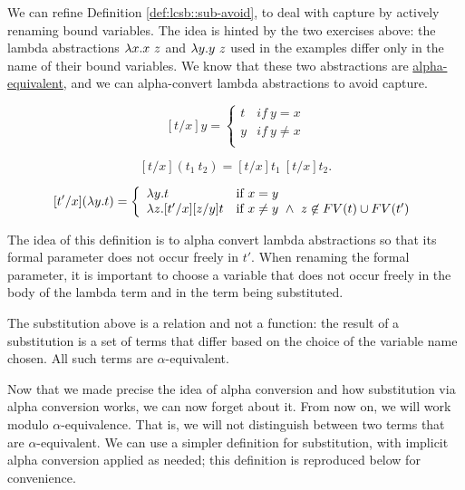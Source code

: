 We can refine
%
Definition \ref{def:lcsb::sub-avoid},
%
to deal with capture by actively renaming bound variables.
%
The idea is hinted by the two exercises above:  the lambda
abstractions $\lambda x.x~z$ and $\lambda y.y~z$ used in the examples differ only in the name of their bound variables.  
%
We know that these two abstractions are 
%
\href{def:lcs::alpha}{alpha-equivalent}, and
%
we can alpha-convert lambda abstractions to avoid capture.  

\begin{flex}
\begin{definition}
\label{def:lcsb::sub-exp}
\[
[t/x]y = \left\{ \begin{array}{ll}
        t & if~y = x \\
        y & if~y\neq x \\
        \end{array} \right.
\]


\[
[t/x](t_1~t_2) = [t/x]t_1~[t/x]t_2.
 \]



\[[t'/x](\lambda y.t)  =
\left\{ \begin{array}{ll}
        \lambda y.t&\mbox{if}~x = y \\
        \lambda z. [t'/x] [z/y] t
        &\mbox{if}~ x \not= y ~ \land ~ z \not\in FV(t) \cup FV(t') \\
       \end{array} \right. \]
\end{definition}

\begin{remark}
The idea of this definition is to alpha convert lambda
abstractions so that its formal parameter does not occur freely in $t'$.
%
When renaming the formal parameter, it is important to choose a variable that does not occur freely in the body of the lambda term and in the term being substituted.
\end{remark}

\begin{note}
The substitution above is a relation and not a function: the result of
a substitution is a set of terms that differ based on the choice of
the variable name chosen.  All such terms are $\alpha$-equivalent.
\end{note}
\end{flex}

\begin{gram}
Now that we made precise the idea of alpha conversion and how
substitution via alpha conversion works, we can now forget about it.
%
From now on, we will work modulo $\alpha$-equivalence.  That is, we
will not distinguish between two terms that are $\alpha$-equivalent.
%
We can  use a simpler  definition for substitution, with implicit alpha conversion applied as needed; this definition is reproduced below for convenience.
\end{gram}


